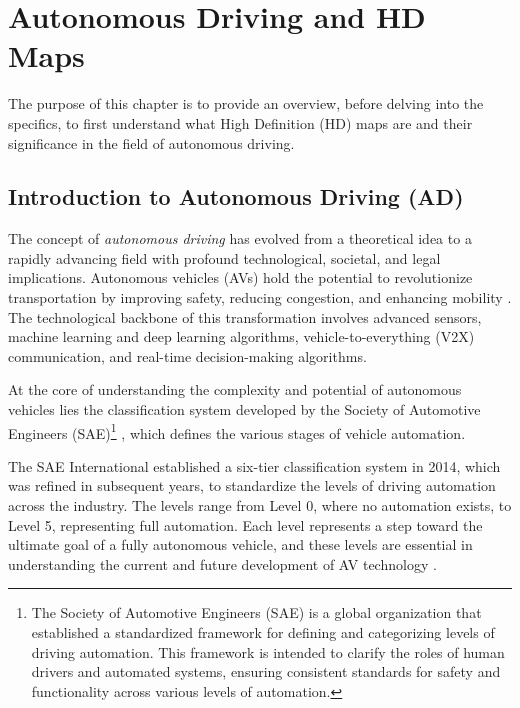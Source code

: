 \NoBgThispage
\chapter{Autonomous Driving and HD Maps}
The purpose of this chapter is to provide an overview, before delving into the specifics, to first understand what High Definition (HD) maps are and their significance in the field of autonomous driving.

\section{Introduction to Autonomous Driving (AD)}
The concept of \textit{autonomous driving} has evolved from a theoretical idea to a rapidly advancing field with profound technological, societal, and legal implications. Autonomous vehicles (AVs) hold the potential to revolutionize transportation by improving safety, reducing congestion, and enhancing mobility \cite{9695620}. The technological backbone of this transformation involves advanced sensors, machine learning and deep learning algorithms, vehicle-to-everything (V2X) communication, and real-time decision-making algorithms.

At the core of understanding the complexity and potential of autonomous vehicles lies the classification system developed by the Society of Automotive Engineers (SAE)\footnote{The Society of Automotive Engineers (SAE) is a global organization that established a standardized framework for defining and categorizing levels of driving automation. This framework is intended to clarify the roles of human drivers and automated systems, ensuring consistent standards for safety and functionality across various levels of automation.} \cite{SAE_J3016_202104}, which defines the various stages of vehicle automation.

The SAE International established a six-tier classification system in 2014, which was refined in subsequent years, to standardize the levels of driving automation across the industry. The levels range from Level 0, where no automation exists, to Level 5, representing full automation. Each level represents a step toward the ultimate goal of a fully autonomous vehicle, and these levels are essential in understanding the current and future development of AV technology \cite{9881892}.

